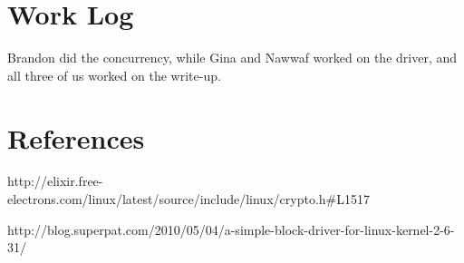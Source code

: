 \documentclass[draftclsnofoot,onecolumn,10pt]{IEEEtran}
\begin{document}
\section{Work Log}
Brandon did the concurrency, while Gina and Nawwaf worked on the driver, and all three of us worked on the write-up.


\section{References}
http://elixir.free-electrons.com/linux/latest/source/include/linux/crypto.h\#L1517

http://blog.superpat.com/2010/05/04/a-simple-block-driver-for-linux-kernel-2-6-31/
\end{document}

